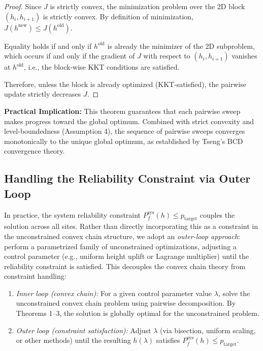 \documentclass[12pt]{article}
\theoremstyle{definition}
\begin{document}
\begin{proof}
Since $J$ is strictly convex, the minimization problem over the 2D block $(h_i, h_{i+1})$ is strictly convex. By definition of minimization, $J(h^{\text{new}}) \leq J(h^{\text{old}})$.

Equality holds if and only if $h^{\text{old}}$ is already the minimizer of the 2D subproblem, which occurs if and only if the gradient of $J$ with respect to $(h_i, h_{i+1})$ vanishes at $h^{\text{old}}$, i.e., the block-wise KKT conditions are satisfied.

Therefore, unless the block is already optimized (KKT-satisfied), the pairwise update strictly decreases $J$.
\end{proof}

\noindent\textbf{Practical Implication:} This theorem guarantees that each pairwise sweep makes progress toward the global optimum. Combined with strict convexity and level-boundedness (Assumption 4), the sequence of pairwise sweeps converges monotonically to the unique global optimum, as established by Tseng's BCD convergence theory.

\subsection*{Handling the Reliability Constraint via Outer Loop}

In practice, the system reliability constraint $P_f^{\text{sys}}(h) \leq p_{\text{target}}$ couples the solution across all sites. Rather than directly incorporating this as a constraint in the unconstrained convex chain structure, we adopt an \emph{outer-loop approach}: perform a parametrized family of unconstrained optimizations, adjusting a control parameter (e.g., uniform height uplift or Lagrange multiplier) until the reliability constraint is satisfied. This decouples the convex chain theory from constraint handling:

\begin{enumerate}
    \item \emph{Inner loop (convex chain):} For a given control parameter value $\lambda$, solve the unconstrained convex chain problem using pairwise decomposition. By Theorems 1--3, the solution is globally optimal for the unconstrained problem.

    \item \emph{Outer loop (constraint satisfaction):} Adjust $\lambda$ (via bisection, uniform scaling, or other methods) until the resulting $h(\lambda)$ satisfies $P_f^{\text{sys}}(h) \leq p_{\text{target}}$.
\end{enumerate}
\end{document}
